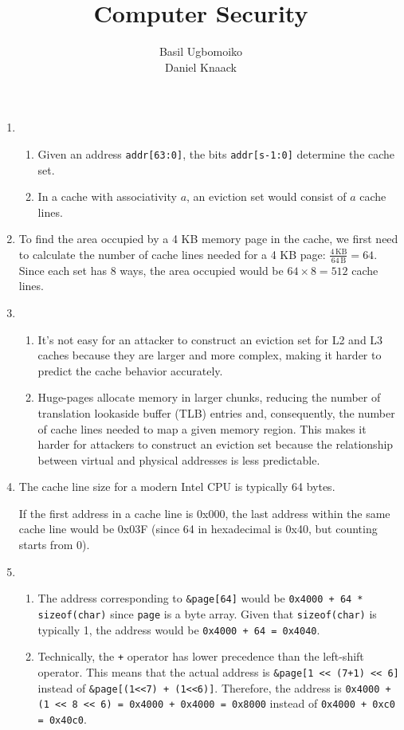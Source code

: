 \documentclass[sheet=2, english]{dexercise}
\title{Computer Security}
\author{Basil Ugbomoiko\\Daniel Knaack}
\begin{document}
\task[Caches]

\begin{enumerate}
  \item
    \begin{enumerate}
      \item
        Given an address \texttt{addr[63:0]}, the bits \texttt{addr[s-1:0]}
        determine the cache set.
      \item
        In a cache with associativity $a$, an eviction set would consist of $a$
        cache lines.
    \end{enumerate}
  \item
    To find the area occupied by a 4 KB memory page in the cache, we first need
    to calculate the number of cache lines needed for a 4 KB page: $\frac{4\,
    \text{KB}}{64\, \text{B}} = 64$.
    Since each set has 8 ways, the area occupied would be $64 \times 8 = 512$
    cache lines.
  \item
    \begin{enumerate}
      \item
        It's not easy for an attacker to construct an eviction set for L2 and
        L3 caches because they are larger and more complex, making it harder to
        predict the cache behavior accurately.
      \item
        Huge-pages allocate memory in larger chunks, reducing the number of
        translation lookaside buffer (TLB) entries and, consequently, the
        number of cache lines needed to map a given memory region.
        This makes it harder for attackers to construct an eviction set because
        the relationship between virtual and physical addresses is less
        predictable.
    \end{enumerate}
  \item
    The cache line size for a modern Intel CPU is typically 64 bytes.

    If the first address in a cache line is 0x000, the last address within the
    same cache line would be 0x03F (since 64 in hexadecimal is 0x40, but
    counting starts from 0).
  \item
    \begin{enumerate}
      \item
        The address corresponding to \texttt{\&page[64]} would be
        \texttt{0x4000 + 64 * sizeof(char)} since \texttt{page} is a byte
        array. Given that \texttt{sizeof(char)} is typically 1, the address
        would be \texttt{0x4000 + 64 = 0x4040}.
      \item
        Technically, the \texttt{+} operator has lower precedence than the
        left-shift operator.
        This means that the actual address is \texttt{\&page[1~<<~(7+1)~<<~6]}
        instead of \texttt{\&page[(1<<7)~+~(1<<6)]}.
        Therefore, the address is \texttt{0x4000 + (1 << 8 << 6) = 0x4000 +
        0x4000 = 0x8000} instead of \texttt{0x4000 + 0xc0 = 0x40c0}.


\end{enumerate}
\end{enumerate}
\end{document}
